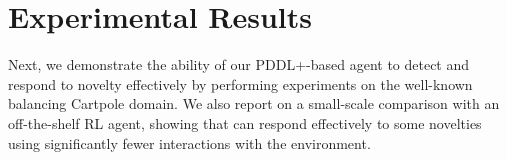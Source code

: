 \documentclass{article}
\begin{document}







\section{Experimental Results}


Next, we demonstrate the ability of our PDDL+-based \hydra agent to detect and respond to novelty effectively by performing experiments on the well-known balancing Cartpole domain. We also report on a small-scale comparison with an off-the-shelf RL agent, showing that \hydra can respond effectively to some novelties using significantly fewer interactions with the environment. 
\end{document}
